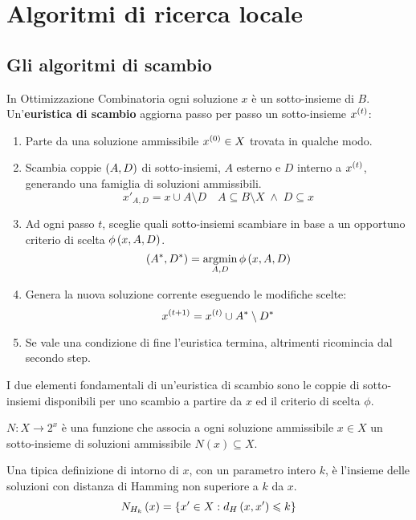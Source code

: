 \documentclass[\main/main.tex]{subfiles}
\begin{document}
\chapter{Algoritmi di ricerca locale}
\section{Gli algoritmi di scambio}
\begin{multicols}{2}
\begin{definition}
    In Ottimizzazione Combinatoria ogni soluzione \(x\) è un sotto-insieme di \(B\). Un'\textbf{euristica di scambio} aggiorna passo per passo un sotto-insieme \(x^{\left(t\right)}\):
\begin{enumerate}
    \item Parte da una soluzione ammissibile \(x^{\left(0\right)} \in X\) trovata in qualche modo.
    \item Scambia coppie \(\left(A, D\right)\) di sotto-insiemi, \(A\) esterno e \(D\) interno a \(x^{\left(t\right)}\), generando una famiglia di soluzioni ammissibili.
    \[
        x'_{A, D} = x \cup A \setminus D \quad A \subseteq B \setminus X\;\land\;D \subseteq x
    \]
    \item Ad ogni passo \(t\), sceglie quali sotto-insiemi scambiare in base a un opportuno criterio di scelta \(\phi\left(x, A, D\right)\).
    \[
        \left(A^*, D^*\right) = \operatorname*{argmin}_{A, D} \phi\left(x, A, D\right)
    \]
    \item Genera la nuova soluzione corrente eseguendo le modifiche scelte:
    \[
        x^{\left(t+1\right)} = x^{\left(t\right)}\cup A^* \setminus D^*
    \]
    \item Se vale una condizione di fine l'euristica termina, altrimenti ricomincia dal secondo step.
\end{enumerate}

I due elementi fondamentali di un'euristica di scambio sono le coppie di sotto-insiemi disponibili per uno scambio a partire da \(x\) ed il criterio di scelta \(\phi\).
\end{definition}
    \begin{definition}[Intorno]
        \(N: X \rightarrow 2^x\) è una funzione che associa a ogni soluzione ammissibile \(x \in X\) un sotto-insieme di soluzioni ammissibile \(N(x) \subseteq X\).
        
        Una tipica definizione di intorno di \(x\), con un parametro intero \(k\), è l'insieme delle soluzioni con distanza di Hamming non superiore a \(k\) da \(x\).
        \[
            N_{H_k}\left(x\right) = \left\{x' \in X: d_H\left(x, x'\right) \leqslant k\right\}
        \]
        

\end{definition}
\end{multicols}
\end{document}
